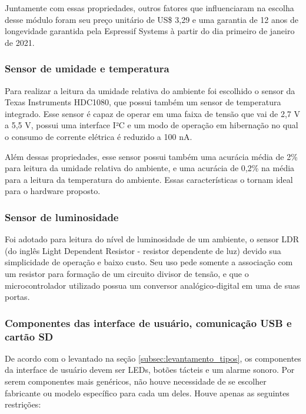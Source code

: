     
    
    

Juntamente com essas propriedades, outros fatores que influenciaram na escolha desse módulo foram seu preço unitário de US\$ 3,29 e uma garantia de 12 anos de longevidade garantida pela Espressif Systems à partir do dia primeiro de janeiro de 2021. 

\subsubsection{Sensor de umidade e temperatura}

Para realizar a leitura da umidade relativa do ambiente foi escolhido o sensor da Texas Instruments HDC1080, que possui também um sensor de temperatura integrado. Esse sensor é capaz de operar em uma faixa de tensão que vai de 2,7 V a 5,5 V, possui uma interface I²C e um modo de operação em hibernação no qual o consumo de corrente elétrica é reduzido a 100 nA.

Além dessas propriedades, esse sensor possui também uma acurácia média de 2\% para leitura da umidade relativa do ambiente, e uma acurácia de 0,2\% na média para a leitura da temperatura do ambiente. Essas características o tornam ideal para o hardware proposto.

\subsubsection{Sensor de luminosidade}

Foi adotado para leitura do nível de luminosidade de um ambiente, o sensor LDR (do inglês Light Dependent Resistor - resistor dependente de luz) devido sua simplicidade de operação e baixo custo. Seu uso pede somente a associação com um resistor para formação de um circuito divisor de tensão, e que o microcontrolador utilizado possua um conversor analógico-digital em uma de suas portas. 





\subsubsection{Componentes das interface de usuário, comunicação USB e cartão SD}

De acordo com o levantado na seção \ref{subsec:levantamento_tipos}, os componentes da interface de usuário devem ser LEDs, botões tácteis e um alarme sonoro. Por serem componentes mais genéricos, não houve necessidade de se escolher fabricante ou modelo específico para cada um deles. Houve apenas as seguintes restrições: 

